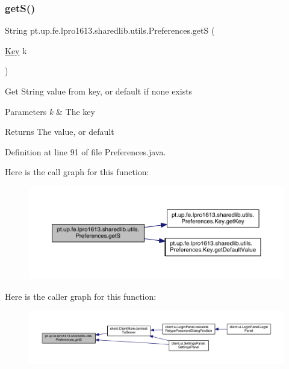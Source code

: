 \subsubsection{\texorpdfstring{get\+S()}{getS()}}
{\footnotesize\ttfamily String pt.\+up.\+fe.\+lpro1613.\+sharedlib.\+utils.\+Preferences.\+getS (\begin{DoxyParamCaption}\item[{\hyperlink{interfacept_1_1up_1_1fe_1_1lpro1613_1_1sharedlib_1_1utils_1_1_preferences_1_1_key}{Key}}]{k }\end{DoxyParamCaption})}

Get String value from key, or default if none exists


\begin{DoxyParams}{Parameters}
{\em k} & The key \\
\hline
\end{DoxyParams}
\begin{DoxyReturn}{Returns}
The value, or default 
\end{DoxyReturn}


Definition at line 91 of file Preferences.\+java.

Here is the call graph for this function\+:
\nopagebreak
\begin{figure}[H]
\begin{center}
\leavevmode
\includegraphics[width=350pt]{classpt_1_1up_1_1fe_1_1lpro1613_1_1sharedlib_1_1utils_1_1_preferences_aada2e7f8fe94b6a7ef78cfb30637b982_cgraph}
\end{center}
\end{figure}
Here is the caller graph for this function\+:
\nopagebreak
\begin{figure}[H]
\begin{center}
\leavevmode
\includegraphics[width=350pt]{classpt_1_1up_1_1fe_1_1lpro1613_1_1sharedlib_1_1utils_1_1_preferences_aada2e7f8fe94b6a7ef78cfb30637b982_icgraph}
\end{center}
\end{figure}
\hypertarget{classpt_1_1up_1_1fe_1_1lpro1613_1_1sharedlib_1_1utils_1_1_preferences_a746848d01972f8874044aef35a8621cb}{}\label{classpt_1_1up_1_1fe_1_1lpro1613_1_1sharedlib_1_1utils_1_1_preferences_a746848d01972f8874044aef35a8621cb} 

